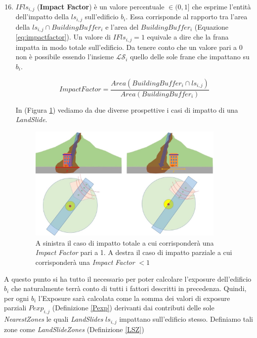\begin{enumerate}
	\setcounter{enumi}{15}
	
	\item \textbf{$IFls_{i,j}$} (\textbf{Impact Factor}) è un valore percentuale $\in(0,1]$ che esprime l'entità dell'impatto della $ls_{i,j}$ sull'edificio $b_i$. Essa corrisponde al rapporto tra l'area della $ls_{i,j} \cap BuildingBuffer_i$ e l'area del $BuildingBuffer_i$ (Equazione \ref{eq:impactfactor}). Un valore di $IFls_{i,j}=1$ equivale a dire che la frana impatta in modo totale sull'edificio. Da tenere conto che un valore pari a 0 non è possibile essendo l'insieme $ \mathcal{LS}_i $ quello delle sole frane che impattano su $b_i$.
	
	\begin{equation}\label{eq:impactfactor}
	ImpactFactor=\frac{Area(BuildingBuffer_i \cap ls_{i,j})}{Area(BuildingBuffer_i)}
	\end{equation}
	
	In (Figura \ref{impact_factor}) vediamo da due diverse prospettive i casi di impatto di una \textit{LandSlide}.
	
	\begin{figure}[h]
		\centering
		\includegraphics[width=0.9\textwidth]{images/landslide5}
		\caption{A sinistra il caso di impatto totale a cui corrisponderà una \textit{Impact Factor} pari a 1. A destra il caso di impatto parziale a cui corrisponderà una \textit{Impact Factor} $<1$  }
		\label{impact_factor}
	\end{figure}
	
\end{enumerate}

\newpage 
A questo punto si ha tutto il necessario per poter calcolare l'exposure dell'edificio $b_i$ che naturalmente terrà conto di tutti i fattori descritti in precedenza. Quindi, per ogni $b_i$ l'Exposure sarà calcolata come la somma dei valori di exposure parziali $Pexp_{i,j}$ (Definizione \ref{Pexp}) derivanti dai contributi delle sole \textit{NearestZones} le quali \textit{LandSlides} $ls_{i,j}$ impattano sull'edificio stesso.
Definiamo tali zone come \textit{LandSlideZones} (Definizione \ref{LSZ})

